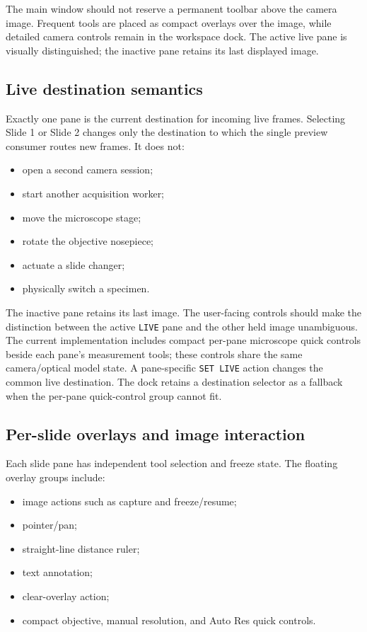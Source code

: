 \documentclass[11pt,a4paper,oneside]{article}
\begin{document}
The main window should not reserve a permanent toolbar above the camera image. Frequent tools are placed as compact overlays over the image, while detailed camera controls remain in the workspace dock. The active live pane is visually distinguished; the inactive pane retains its last displayed image.

\subsection{Live destination semantics}
Exactly one pane is the current destination for incoming live frames. Selecting Slide 1 or Slide 2 changes only the destination to which the single preview consumer routes new frames. It does not:
\begin{itemize}
  \item open a second camera session;
  \item start another acquisition worker;
  \item move the microscope stage;
  \item rotate the objective nosepiece;
  \item actuate a slide changer;
  \item physically switch a specimen.
\end{itemize}

The inactive pane retains its last image. The user-facing controls should make the distinction between the active \texttt{LIVE} pane and the other held image unambiguous. The current implementation includes compact per-pane microscope quick controls beside each pane's measurement tools; these controls share the same camera/optical model state. A pane-specific \texttt{SET LIVE} action changes the common live destination. The dock retains a destination selector as a fallback when the per-pane quick-control group cannot fit.

\subsection{Per-slide overlays and image interaction}
Each slide pane has independent tool selection and freeze state. The floating overlay groups include:
\begin{itemize}
  \item image actions such as capture and freeze/resume;
  \item pointer/pan;
  \item straight-line distance ruler;
  \item text annotation;
  \item clear-overlay action;
  \item compact objective, manual resolution, and Auto Res quick controls.
\end{itemize}
\end{document}

